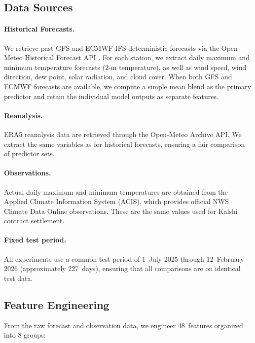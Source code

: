 \documentclass{ametsocV6.1}
\begin{document}
\subsection{Data Sources}
\label{sec:data_sources}

\paragraph{Historical Forecasts.}
We retrieve past GFS and ECMWF IFS deterministic forecasts via the Open-Meteo
Historical Forecast API \citep{zippenfenig2023openmeteo}. For each station, we
extract daily maximum and minimum temperature forecasts (2-m temperature), as well
as wind speed, wind direction, dew point, solar radiation, and cloud cover. When
both GFS and ECMWF forecasts are available, we compute a simple mean blend as the
primary predictor and retain the individual model outputs as separate features.

\paragraph{Reanalysis.}
ERA5 reanalysis data \citep{hersbach2020era5} are retrieved through the Open-Meteo
Archive API. We extract the same variables as for historical forecasts, ensuring
a fair comparison of predictor sets.

\paragraph{Observations.}
Actual daily maximum and minimum temperatures are obtained from the Applied Climate
Information System (ACIS), which provides official NWS Climate Data Online
observations. These are the same values used for Kalshi contract settlement.

\paragraph{Fixed test period.}
All experiments use a common test period of 1~July 2025 through 12~February 2026
(approximately 227~days), ensuring that all comparisons are on identical test data.

\subsection{Feature Engineering}
\label{sec:features}

From the raw forecast and observation data, we engineer 48~features organized into
8 groups:
\end{document}
